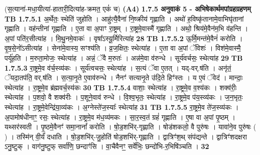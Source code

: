 \documentclass[17pt]{extarticle}
\begin{document}
                  \newline
                                    (स॒त्याना॑-मधा॒यीत्या॑-हातारी॒दित्या॑ह-क्रमत॒ एकं॑ च) \textbf{(A4)} \newline \newline
                \textbf{ 1.7.5     अनुवाकं   5 - अभिषेकार्थमपांग्रहग्रहणम्} \newline
                                \textbf{ TB 1.7.5.1} \newline
                  अ॒र्थेतः॒ स्थेति॑ जुहोति । आहु॑त्यै॒वैना॑ नि॒ष्क्रीय॑ गृह्णाति । अथो॑ ह॒विष्कृ॑तानामे॒वाभिघृ॑तानां गृह्णाति । वह॑न्तीनां गृह्णाति । ए॒ता वा अ॒पाꣳ रा॒ष्ट्रम् । रा॒ष्ट्रमे॒वास्मै॑ गृह्णाति । अथो॒ श्रिय॑मे॒वैन॑म॒भि व॑हन्ति । अ॒पां पति॑र॒सीत्या॑ह । मि॒थु॒नमे॒वाकः॑ । वृषा᳚ऽस्यू॒र्मिरित्या॑ह \textbf{ 28} \newline
                  \newline
                                \textbf{ TB 1.7.5.2} \newline
                  ऊ॒र्मि॒मन्त॑मे॒वैनं॑ करोति । वृ॒ष॒से॒नो॑ऽसीत्या॑ह । सेना॑मे॒वास्य॒ सꣳश्य॑ति । व्र॒ज॒क्षितः॒ स्थेत्या॑ह । ए॒ता वा अ॒पां ॅविशः॑ । विश॑मे॒वास्मै॒ पर्यू॑हति । म॒रुता॒मोजः॒ स्थेत्या॑ह । अन्नं॒ ॅवै म॒रुतः॑ । अन्न॑मे॒वा व॑रुन्धे । सूर्य॑वर्चसः॒ स्थेत्या॑ह \textbf{ 29} \newline
                  \newline
                                \textbf{ TB 1.7.5.3} \newline
                  रा॒ष्ट्रमे॒व व॑र्च॒स्व्य॑कः । सूर्य॑त्वचसः॒ स्थेत्या॑ह । स॒त्यं ॅवा ए॒तत् । यद्-वर्.ष॑ति । अनृ॑तं॒ ॅयदा॒तप॑ति॒ वर्.ष॑ति । स॒त्या॒नृ॒ते ए॒वाव॑रुन्धे । नैनꣳ॑ सत्यानृ॒ते उ॑दि॒ते हिꣳ॑स्तः । य ए॒वं ॅवेद॑ । मान्दाः॒ स्थेत्या॑ह । रा॒ष्ट्रमे॒व ब्र॑ह्मवर्च॒स्य॑कः \textbf{ 30} \newline
                  \newline
                                \textbf{ TB 1.7.5.4} \newline
                  वाशाः॒ स्थेत्या॑ह । रा॒ष्ट्रमे॒व व॒श्य॑कः । शक्व॑रीः॒ स्थेत्या॑ह । प॒शवो॒ वै शक्व॑रीः । प॒शूने॒वाव॑ रुन्धे । वि॒श्व॒भृतः॒ स्थेत्या॑ह । रा॒ष्ट्रमे॒व प॑य॒स्व्य॑कः । ज॒न॒भृतः॒ स्थेत्या॑ह । रा॒ष्ट्रमे॒वेन्द्रि॑या॒व्य॑कः । अ॒ग्नेस्ते॑ज॒स्याः᳚ स्थेत्या॑ह \textbf{ 31} \newline
                  \newline
                                \textbf{ TB 1.7.5.5} \newline
                  रा॒ष्ट्रमे॒व ते॑ज॒स्व्य॑कः । अ॒पामोष॑धीनाꣳ॒॒ रसः॒ स्थेत्या॑ह । रा॒ष्ट्रमे॒व म॑ध॒व्य॑मकः । सा॒र॒स्व॒तं ग्रहं॑ गृह्णाति । ए॒षा वा अ॒पां पृ॒ष्ठम् । यथ्सर॑स्वती । पृ॒ष्ठमे॒वैनꣳ॑ समा॒नानां᳚ करोति । षो॒ड॒शभि॑र्-गृह्णाति । षोड॑शकलो॒ वै पुरु॑षः । यावा॑ने॒व पुरु॑षः ( ) । तस्मि॑न् वी॒र्यं॑ दधाति । षो॒ड॒शभि॑र्-जु॒होति॑ षोड॒शभि॑र्-गृह्णाति । द्वात्रिꣳ॑श॒थ् संप॑द्यन्ते । द्वात्रिꣳ॑शदक्षरा ऽनु॒ष्टुक् । वाग॑नु॒ष्टुफ् सर्वा॑णि॒ छन्दाꣳ॑सि । वा॒चैवैनꣳ॒॒ सर्वे॑भिः॒ छन्दो॑भि-र॒भिषि॑ञ्चति । \textbf{ 32} \newline
\end{document}
